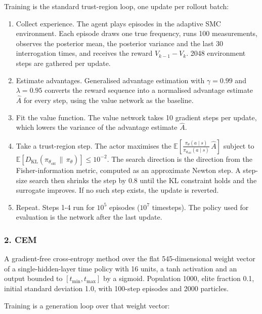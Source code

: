 \documentclass[12pt,a4paper]{article}
\begin{document}
Training is the standard trust-region loop, one update per rollout batch:

\begin{enumerate}
  \item Collect experience. The agent plays episodes in the adaptive SMC environment. Each episode
  draws one true frequency, runs \num{100} measurements, observes the posterior mean, the posterior
  variance and the last 30 interrogation times, and receives the reward $V_{k-1} - V_k$. \num{2048}
  environment steps are gathered per update.
  \item Estimate advantages. Generalised advantage estimation with $\gamma = 0.99$ and $\lambda =
  0.95$ converts the reward sequence into a normalised advantage estimate $\hat A$ for every step,
  using the value network as the baseline.
  \item Fit the value function. The value network takes \num{10} gradient steps per update, which
  lowers the variance of the advantage estimate $\hat A$.
  \item Take a trust-region step. The actor maximises the
  $\mathbb{E}\!\left[\frac{\pi_\theta(a\mid s)}{\pi_{\theta_{\mathrm{old}}}(a\mid s)}\,\hat
  A\right]$ subject to $\mathbb{E}\!\left[D_{\mathrm{KL}}(\pi_{\theta_{\mathrm{old}}} \,\|\,
  \pi_\theta)\right] \le 10^{-2}$. The search direction is the direction from the
  Fisher-information metric, computed as an approximate Newton step. A step-size search then
  shrinks the step by $0.8$ until the KL constraint holds and the surrogate improves. If no such
  step exists, the update is reverted.
  \item Repeat. Steps 1-4 run for $10^5$ episodes ($10^7$ timesteps). The policy used for
  evaluation is the network after the last update.
\end{enumerate}

\subsubsection{2. CEM}
\label{sec:method-cem}
A gradient-free cross-entropy method over the flat 545-dimensional weight vector of a
single-hidden-layer time policy with 16 units, a tanh activation and an output bounded to
$[t_{\min}, t_{\max}]$ by a sigmoid.
Population 1000, elite fraction 0.1, initial standard deviation 1.0, with 100-step episodes and 2000
particles.

Training is a generation loop over that weight vector:
\end{document}
